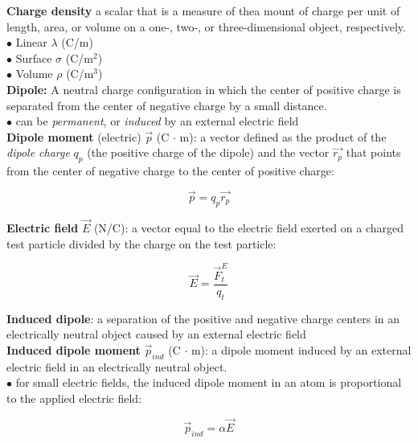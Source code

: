         \textbf{Charge density} a scalar that is a measure of thea mount of charge per unit of length, area, or volume on a one-, two-, or three-dimensional object, respectively. \\
        $\bullet$ Linear $\lambda$ (C/m) \\
        $\bullet$ Surface $\sigma$ (C/$\text{m}^2$) \\
        $\bullet$ Volume $\rho$ (C/$\text{m}^3$) \\
        \textbf{Dipole:} A neutral charge configuration in which the center of positive charge is separated from the center of negative charge by a small distance. \\
        $\bullet$ can be \textit{permanent}, or \textit{induced} by an external electric field \\
        \textbf{Dipole moment} (electric) $\vec{p}$ (C $\cdot$ m): a vector defined as the product of the \textit{dipole charge} $q_p$ (the positive charge of the dipole) and the vector $\vec{r_p}$ that points from the
        center of negative charge to the center of positive charge:

        \[
            \vec{p} = q_p \vec{r_p}
        \]

        \textbf{Electric field} $\vec{E}$ (N/C): a vector equal to the electric field exerted on a charged test particle divided by the charge on the test particle:

        \[
            \vec{E} = \frac{\vec{F}^E_t}{q_t}
        \]

        \textbf{Induced dipole}: a separation of the positive and negative charge centers in an electrically neutral object caused by an external electric field \\
        \textbf{Induced dipole moment} $\vec{p}_{ind}$ (C $\cdot$ m): a dipole moment induced by an external electric field in an electrically neutral object. \\
        $\bullet$ for small electric fields, the induced dipole moment in an atom is proportional to the applied electric field:

        \[
            \vec{p}_{ind} = \alpha \vec{E}
        \]

